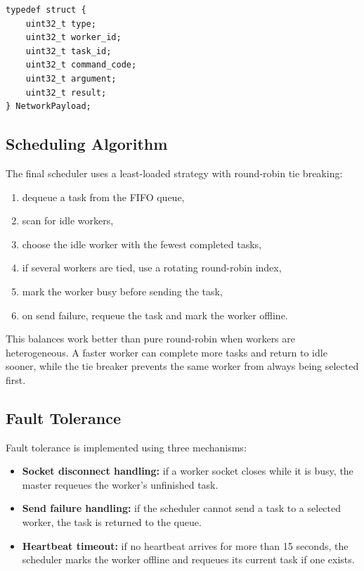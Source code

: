 \documentclass[12pt,a4paper]{article}
\begin{document}
\begin{lstlisting}[style=cstyle, caption={Network payload shape.}]
typedef struct {
    uint32_t type;
    uint32_t worker_id;
    uint32_t task_id;
    uint32_t command_code;
    uint32_t argument;
    uint32_t result;
} NetworkPayload;
\end{lstlisting}

\subsection{Scheduling Algorithm}

The final scheduler uses a least-loaded strategy with round-robin tie breaking:

\begin{enumerate}[noitemsep]
    \item dequeue a task from the FIFO queue,
    \item scan for idle workers,
    \item choose the idle worker with the fewest completed tasks,
    \item if several workers are tied, use a rotating round-robin index,
    \item mark the worker busy before sending the task,
    \item on send failure, requeue the task and mark the worker offline.
\end{enumerate}

This balances work better than pure round-robin when workers are heterogeneous. A faster worker can complete more tasks and return to idle sooner, while the tie breaker prevents the same worker from always being selected first.

\subsection{Fault Tolerance}

Fault tolerance is implemented using three mechanisms:

\begin{itemize}[noitemsep]
    \item \textbf{Socket disconnect handling:} if a worker socket closes while it is busy, the master requeues the worker's unfinished task.
    \item \textbf{Send failure handling:} if the scheduler cannot send a task to a selected worker, the task is returned to the queue.
    \item \textbf{Heartbeat timeout:} if no heartbeat arrives for more than 15 seconds, the scheduler marks the worker offline and requeues its current task if one exists.
\end{itemize}
\end{document}
